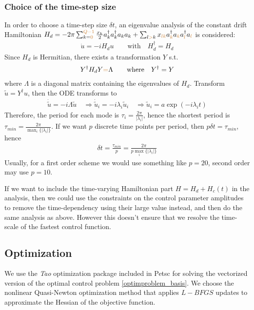 \documentclass[letterpaper]{article}
\newcommand{\YC}[1]{{\textcolor{Bronze}{#1}}}
\begin{document}
    \subsubsection{Choice of the time-step size}
    In order to choose a time-step size $\delta t$, an eigenvalue analysis of
    the constant drift Hamiltonian $H_d =  -2\pi \sum_{k=\YC{0}}^{\YC{Q-1}} \frac{x_k}{2}
    a_k^{\dagger}a_k^{\dagger}a_ka_k + \sum_{l\YC{>}k} x_{\YC{lk}}
    a_{\YC{k}}^{\dagger}a_{\YC{k}}
    a_{\YC{l}}^{\dagger}a_{\YC{l}}$ is considered:
       \begin{align*}  
         \dot u = -i H_d u \qquad \text{with} \quad H_d^{\dagger}  = H_d
       \end{align*} 
       Since $H_d$ is Hermitian, there exists a transformation $Y$ s.t. 
       \begin{align*}
         Y^{\dagger}H_d Y \YC{=} \Lambda \qquad  \text{where} \quad Y^{\dagger} = Y
       \end{align*}
       where $\Lambda$ is a diagonal matrix containing the eigenvalues of $H_d$.
       Transform $\tilde u = Y^{\dagger} u$, then the ODE transforms to 
       \begin{align*}
         \dot \tilde u = -i \Lambda \tilde u \quad \Rightarrow \dot \tilde u_i =
         -i\lambda_i \tilde u_i \quad \Rightarrow \tilde u_i = a
         \exp(-i\lambda_i t)
       \end{align*}
       Therefore, the period for each mode is $\tau_i =
       \frac{2\pi}{|\lambda_i|}$, hence the shortest period is $\tau_{min} =
       \frac{2\pi}{\max_i\{|\lambda_i|\}}$. If we want $p$ discrete time points
       per period, then $p\delta t = \tau_{min}$, hence 
       \begin{align*}
         \delta t = \frac{\tau_{min}}{p} = \frac{2\pi}{p\max_i\{|\lambda_i|\}}
       \end{align*}
       Usually, for a first order scheme we would use something like $p=20$,
       second order may use $p=10$. 

       If we want to include the time-varying Hamiltonian part $H = H_d +
       H_c(t)$ in the analysis, then we could use the constraints on the control
       parameter amplitudes to remove the time-dependency using their large
       value instead, and then do the same analysis as above. However this
       doesn't ensure that we resolve the time-scale of the fastest control
       function. 

  \subsection{Optimization}
    We use the \textit{Tao} optimization package included in Petsc for solving
    the vectorized version of the optimal control problem
    \eqref{optimproblem_basis}. We choose the nonlinear Quasi-Newton
    optimization method that applies $L-BFGS$ updates to approximate the Hessian
    of the objective function. 
\end{document}

